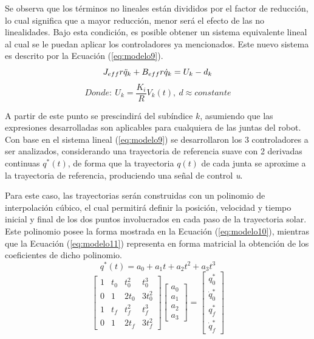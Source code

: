 Se observa que los términos no lineales están divididos por el factor de reducción, lo cual significa que a mayor reducción, menor será el efecto de las no linealidades. Bajo esta condición, es posible obtener un sistema equivalente lineal al cual se le puedan aplicar los controladores ya mencionados. Este nuevo sistema es descrito por la Ecuación (\ref{eq:modelo9}).
\begin{equation} \label{eq:modelo9}
    J_{eff} r\Ddot{q}_k+B_{eff} r\Dot{q}_k=U_k-d_k
\end{equation}
\begin{equation}
    Donde:\ U_k=\frac{K_i}{R}V_k (t),\ d \approx constante
\end{equation}

A partir de este punto se prescindirá del subíndice $ k $, asumiendo que las expresiones desarrolladas son aplicables para cualquiera de las juntas del robot. Con base en el sistema lineal (\ref{eq:modelo9}) se desarrollaron los 3 controladores a ser analizados, considerando una trayectoria de referencia suave con 2 derivadas continuas $ q^* (t) $, de forma que la trayectoria $ q(t) $ de cada junta se aproxime a la trayectoria de referencia, produciendo una señal de control \textit{u}.

Para este caso, las trayectorias serán construidas con un polinomio de interpolación cúbico, el cual permitirá definir la posición, velocidad y tiempo inicial y final de los dos puntos involucrados en cada paso de la trayectoria solar. Este polinomio posee la forma mostrada en la Ecuación (\ref{eq:modelo10}), mientras que la Ecuación (\ref{eq:modelo11}) representa en forma matricial la obtención de los coeficientes de dicho polinomio.
\begin{equation} \label{eq:modelo10}
    q^* (t)=a_0+a_1 t+a_2 t^2+a_3 t^3
\end{equation}
\begin{equation} \label{eq:modelo11}
    \begin{bmatrix}
        1 & t_0 & t_0^2 & t_0^3 \\
        0 & 1 & 2t_0 & 3t_0^2 \\
        1 & t_f & t_f^2 & t_f^3 \\
        0 & 1 & 2t_f & 3t_f^2
    \end{bmatrix}
    \begin{bmatrix}
        a_0 \\
        a_1 \\
        a_2 \\
        a_3
    \end{bmatrix}
    =
    \begin{bmatrix}
        q_0^* \\
        \Dot{q}_0^* \\
        q_f^* \\
        \Dot{q}_f^*
    \end{bmatrix}
\end{equation}

